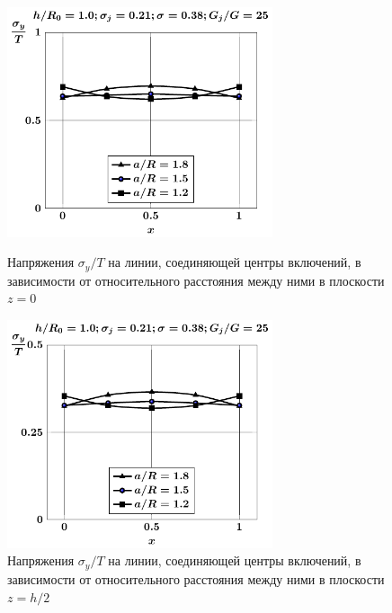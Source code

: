 \begin{figure}[h!]
\centering\footnotesize
\parbox[b]{7.5cm}{\centering\includegraphics[width=7.8cm]{inc16-a-h10-r10-g25-z0-sig-y.pdf}
\caption{Напряжения $\sigma_y/T$ на линии, соединяющей центры включений, в зависимости от относительного расстояния между ними в плоскости $z=0$
\label{fig:4}}}\hfil\hfil
\parbox[b]{7.5cm}{\centering\includegraphics[width=7.8cm]{inc16-a-h10-r10-g25-z1-sig-y.pdf}
\caption{Напряжения $\sigma_y/T$ на линии, соединяющей центры включений, в зависимости от относительного расстояния между ними в плоскости $z=h/2$
\label{fig:5}
}}
\end{figure}

